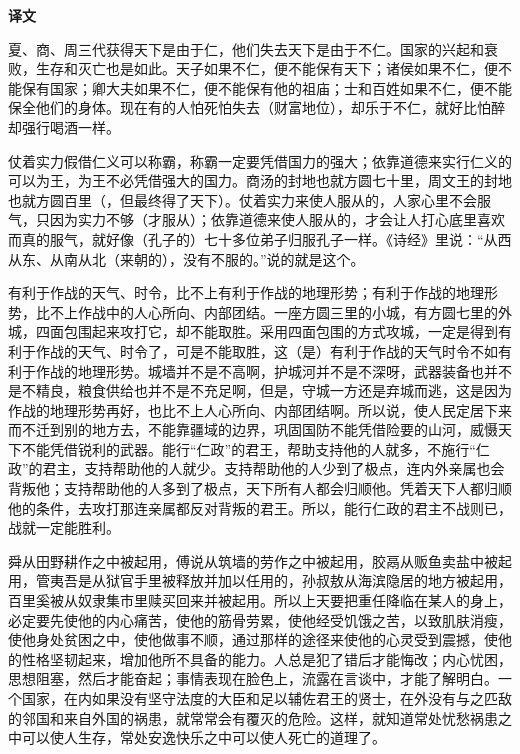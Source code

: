 \documentclass[12pt,UTF-8,openany,a4]{ctexbook}
\begin{document}
\newpage

\begin{Large}
    \noindent\textbf{译文}
\end{Large}


\vspace{1em}

\begin{large}
    \yiwen 
    夏、商、周三代获得天下是由于仁，他们失去天下是由于不仁。国家的兴起和衰败，生存和灭亡也是如此。天子如果不仁，便不能保有天下；诸侯如果不仁，便不能保有国家；卿大夫如果不仁，便不能保有他的祖庙；士和百姓如果不仁，便不能保全他们的身体。现在有的人怕死怕失去（财富地位），却乐于不仁，就好比怕醉却强行喝酒一样。
    
    仗着实力假借仁义可以称霸，称霸一定要凭借国力的强大；依靠道德来实行仁义的可以为王，为王不必凭借强大的国力。商汤的封地也就方圆七十里，周文王的封地也就方圆百里（，但最终得了天下）。仗着实力来使人服从的，人家心里不会服气，只因为实力不够（才服从）；依靠道德来使人服从的，才会让人打心底里喜欢而真的服气，就好像（孔子的）七十多位弟子归服孔子一样。《诗经》里说：“从西从东、从南从北（来朝的），没有不服的。”说的就是这个。
    
    有利于作战的天气、时令，比不上有利于作战的地理形势；有利于作战的地理形势，比不上作战中的人心所向、内部团结。一座方圆三里的小城，有方圆七里的外城，四面包围起来攻打它，却不能取胜。采用四面包围的方式攻城，一定是得到有利于作战的天气、时令了，可是不能取胜，这（是）有利于作战的天气时令不如有利于作战的地理形势。城墙并不是不高啊，护城河并不是不深呀，武器装备也并不是不精良，粮食供给也并不是不充足啊，但是，守城一方还是弃城而逃，这是因为作战的地理形势再好，也比不上人心所向、内部团结啊。所以说，使人民定居下来而不迁到别的地方去，不能靠疆域的边界，巩固国防不能凭借险要的山河，威慑天下不能凭借锐利的武器。能行“仁政”的君王，帮助支持他的人就多，不施行“仁政”的君主，支持帮助他的人就少。支持帮助他的人少到了极点，连内外亲属也会背叛他；支持帮助他的人多到了极点，天下所有人都会归顺他。凭着天下人都归顺他的条件，去攻打那连亲属都反对背叛的君王。所以，能行仁政的君主不战则已，战就一定能胜利。
    
    舜从田野耕作之中被起用，傅说从筑墙的劳作之中被起用，胶鬲从贩鱼卖盐中被起用，管夷吾是从狱官手里被释放并加以任用的，孙叔敖从海滨隐居的地方被起用，百里奚被从奴隶集市里赎买回来并被起用。所以上天要把重任降临在某人的身上，必定要先使他的内心痛苦，使他的筋骨劳累，使他经受饥饿之苦，以致肌肤消瘦，使他身处贫困之中，使他做事不顺，通过那样的途径来使他的心灵受到震撼，使他的性格坚韧起来，增加他所不具备的能力。人总是犯了错后才能悔改；内心忧困，思想阻塞，然后才能奋起；事情表现在脸色上，流露在言谈中，才能了解明白。一个国家，在内如果没有坚守法度的大臣和足以辅佐君王的贤士，在外没有与之匹敌的邻国和来自外国的祸患，就常常会有覆灭的危险。这样，就知道常处忧愁祸患之中可以使人生存，常处安逸快乐之中可以使人死亡的道理了。
    

\end{large}
\end{document}
